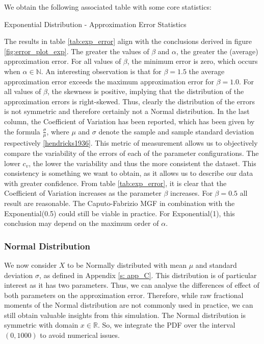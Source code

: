We obtain the following associated table with some core statistics:
\begin{table}[H]
    \centering

\caption{Exponential Distribution - Approximation Error Statistics} 
\label{tab:exp_error}
\end{table}

The results in table \ref{tab:exp_error} align with the conclusions derived in figure \ref{fig:error_plot_exp}. The greater the values of \(\beta\) and \(\alpha\), the greater the (average) approximation error. For all values of \(\beta\), the minimum error is zero, which occurs when \(\alpha \in \mathbb{N}\). An interesting observation is that for \(\beta = 1.5\) the average approximation error exceeds the maximum approximation error for \(\beta = 1.0\). For all values of \(\beta\), the skewness is positive, implying that the distribution of the approximation errors is right-skewed. Thus, clearly the distribution of the errors is not symmetric and therefore certainly not a Normal distribution. In the last column, the Coefficient of Variation has been reported, which has been given by the formula \(\frac{\sigma}{\mu}\), where \(\mu\) and \(\sigma\) denote the sample and sample standard deviation respectively \ref{hendricks1936}. This metric of measurement allows us to objectively compare the variability of the errors of each of the parameter configurations. The lower \(c_v\), the lower the variability and thus the more consistent the dataset. This consistency is something we want to obtain, as it allows us to describe our data with greater confidence. From table \ref{tab:exp_error}, it is clear that the Coefficient of Variation increases as the parameter \(\beta\) increases. For \(\beta = 0.5\) all result are reasonable. The Caputo-Fabrizio MGF in combination with the Exponential(0.5) could still be viable in practice. For Exponential(1), this conclusion may depend on the maximum order of \(\alpha\).

\subsubsection{Normal Distribution}
We now consider \(X\) to be Normally distributed with mean \(\mu\) and standard deviation \(\sigma\), as defined in Appendix \ref{s: app_C}. This distribution is of particular interest as it has two parameters. Thus, we can analyse the differences of effect of both parameters on the approximation error. Therefore, while raw fractional moments of the Normal distribution are not commonly used in practice, we can still obtain valuable insights from this simulation.  The Normal distribution is symmetric with domain \(x \in \mathbb{R}\). So, we integrate the PDF over the interval \((0, 1000)\) to avoid numerical issues.
\newline

